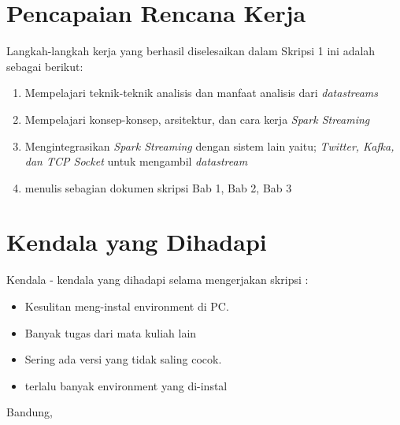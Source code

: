 \documentclass[a4paper,twoside]{article}
\begin{document}
\section{Pencapaian Rencana Kerja}
Langkah-langkah kerja yang berhasil diselesaikan dalam Skripsi 1 ini adalah sebagai berikut:
\begin{enumerate}
\item Mempelajari teknik-teknik analisis dan manfaat analisis dari \textit{datastreams}
\item Mempelajari konsep-konsep, arsitektur, dan cara kerja \textit{Spark Streaming}
\item Mengintegrasikan \textit{Spark Streaming} dengan sistem lain yaitu; \textit{Twitter, 			  Kafka, dan TCP Socket} untuk mengambil \textit{datastream}
\item menulis sebagian dokumen skripsi Bab 1, Bab 2, Bab 3 
\end{enumerate}



\section{Kendala yang Dihadapi}
Kendala - kendala yang dihadapi selama mengerjakan skripsi :
\begin{itemize}
	\item Kesulitan meng-instal environment di PC.
	\item Banyak tugas dari mata kuliah lain
	\item Sering ada versi yang tidak saling cocok.
	\item terlalu banyak environment yang di-instal
	
\end{itemize}

\vspace{1cm}
\centering Bandung, \tanggal\\
\vspace{2cm} \nama \\ 
\vspace{1cm}
\end{document}

